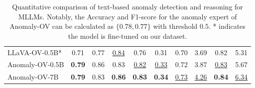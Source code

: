 \begin{table*}
\begin{tabular}{lccccccccc}
\hline
LLaVA-OV-0.5B*   & 0.71              & 0.77      & \underline{0.84}   & 0.76     & 0.31                    &  0.70     & 3.69          & 0.82                     &  5.31         \\
Anomaly-OV-0.5B & \textbf{0.79}              & 0.86      & 0.83   & \underline{0.82}     & \underline{0.33}                    & 0.72      & 3.87          &  \underline{0.83}                    &  5.67         \\
Anomaly-OV-7B    & \textbf{0.79}                  & 0.83          & \textbf{0.86}      & \textbf{0.83}         &  \textbf{0.34}                   & \underline{0.73}      & \underline{4.26}          & \textbf{0.84}                     &  \underline{6.34}        \\
\bottomrule
\end{tabular}
\caption{Quantitative comparison of text-based anomaly detection and reasoning for MLLMs. Notably, the Accuracy and F1-score for the anomaly expert of Anomaly-OV can be calculated as $\{0.78, 0.77\}$ with threshold $0.5$. * indicates the model is fine-tuned on our dataset.}
\label{Tab:3}
 \vspace{-3mm}
\end{table*}